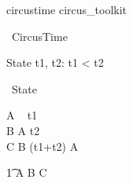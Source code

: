 \documentclass{article}
\begin{document}
\begin{zsection}
\SECTION circustime \parents circus\_toolkit
\end{zsection}

\begin{circus}
   \circprocess\ CircusTime \circdef \circbegin
\end{circus}

\begin{schema}{State}
   t1, t2: \nat
\where
   t1 < t2
\end{schema}

\begin{circusaction}
   \circstate\ State
\end{circusaction}

\begin{circusaction}
   A \circdef \circwait~ t1 \\
   B \circdef A \circdeadline t2 \\
   C \circdef B \lcirctimeout (t1+t2) \rcirctimeout A
\end{circusaction}

\begin{circusaction}
   \t1 \circspot A \circseq B \circseq C
\end{circusaction}

\begin{circus}
   \circend
\end{circus}
\end{document}
